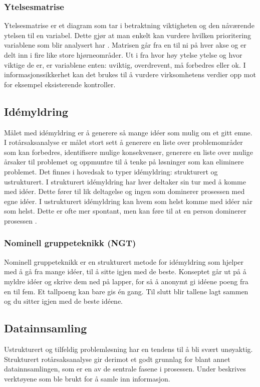 \subsubsection{Ytelsesmatrise}
Ytelsesmatrise er et diagram som tar i betraktning viktigheten og den nåværende ytelsen til en variabel. Dette gjør at man enkelt kan vurdere hvilken prioritering variablene som blir analysert har \cite{RCA}. Matrisen går fra en til ni på hver akse og er delt inn i fire like store hjørneområder. Ut i fra hvor høy ytelse ytelse og hvor viktige de er, er variablene enten: uviktig, overdrevent, må forbedres eller ok. I informasjonssikkerhet kan det brukes til å vurdere virksomhetens verdier opp mot for eksempel eksisterende kontroller.

\subsection{Idémyldring}
Målet med idémyldring er å generere så mange idéer som mulig om et gitt emne. I rotårsaksanalyse er målet stort sett å generere en liste over problemområder som kan forbedres, identifisere mulige konsekvenser, generere en liste over mulige årsaker til problemet og oppmuntre til å tenke på løsninger som kan eliminere problemet. Det finnes i hovedsak to typer idémyldring: strukturert og ustrukturert. I strukturert idémyldring har hver deltaker sin tur med å komme med idéer. Dette fører til lik deltagelse og ingen som dominerer prosessen med egne idéer. I ustrukturert idémyldring kan hvem som helst komme med idéer når som helst. Dette er ofte mer spontant, men kan føre til at en person dominerer prosessen \cite{RCA}. 

\subsubsection{Nominell gruppeteknikk (NGT)}
Nominell gruppeteknikk er en strukturert metode for idémyldring som hjelper med å gå fra mange idéer, til å sitte igjen med de beste. Konseptet går ut på å myldre idéer og skrive dem ned på lapper, for så å anonymt gi idéene poeng fra en til fem. Et tallpoeng kan bare gis én gang. Til slutt blir tallene lagt sammen og du sitter igjen med de beste idéene. 

\subsection{Datainnsamling}
Ustrukturert og tilfeldig problemløsning har en tendens til å bli svært unøyaktig. Strukturert rotårsaksanalyse gir derimot et godt grunnlag for blant annet datainnsamlingen, som er en av de sentrale fasene i prosessen. Under beskrives verktøyene som ble brukt for å samle inn informasjon. 

